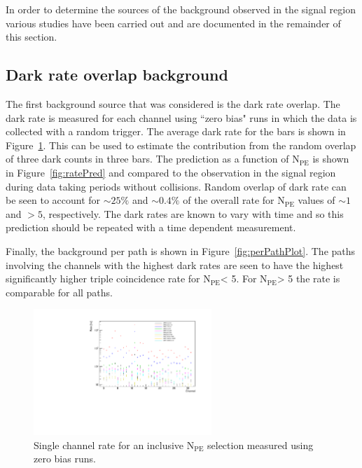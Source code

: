 \documentclass[12pt]{article}
\newcommand{\npe} {\mbox{\ensuremath{\textrm{N}_\textrm{PE}}}\xspace}
\begin{document}
In order to determine the sources of the background observed in the signal region 
various studies have been carried out and are documented in the remainder of this section.

\subsection{Dark rate overlap background}

The first background source that was considered is the dark rate overlap. The dark rate is measured
for each channel using ``zero bias" runs in which the data is collected with a random trigger.
The average dark rate for the bars is shown in Figure~\ref{fig:darkRate}. This can be used to estimate the 
contribution from the random overlap of three dark counts in three bars. 
The prediction as a function of \npe is shown in Figure~\ref{fig:ratePred} and 
compared to the observation in the signal region during data taking periods without collisions. 
Random overlap of dark rate can be seen to account for $\sim25\%$ and $\sim0.4\%$ 
of the overall rate for \npe values of $\sim 1$ and $> 5$, respectively. The dark rates are 
known to vary with time and so this prediction should be repeated with a time
dependent measurement.

Finally, the background per path is shown in Figure~\ref{fig:perPathPlot}. The paths involving
the channels with the highest dark rates are seen to have the highest 
significantly higher triple coincidence rate for \npe < 5. For \npe > 5 the
rate is comparable for all paths.
\begin{figure}[ht!]
    \centering
    \includegraphics[width=0.6\textwidth]{figures/singlesRatesUnbiasedQuietSinglePulseInChanHeightAllUnbiasedBinnedAsSignal}
    \caption{\label{fig:darkRate} Single channel rate for an inclusive \npe selection measured using zero bias runs.}
\end{figure}
\end{document}
